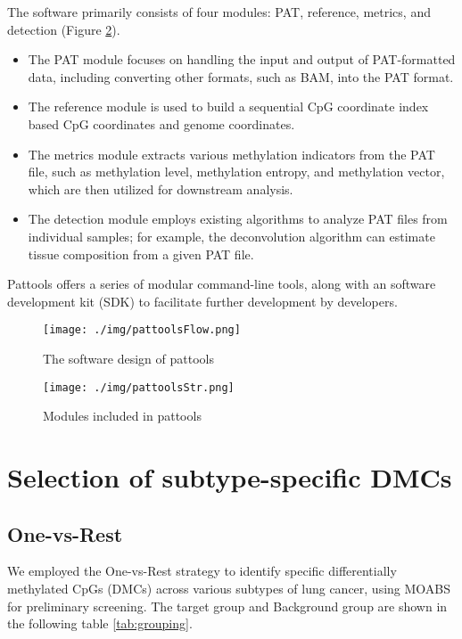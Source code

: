 \documentclass[12pt,letterpaper]{article}
\begin{document}
The software primarily consists of four modules: PAT, reference, metrics, and detection  (Figure \ref*{fig:pattoolsStr}).

\begin{itemize}
    \item  The PAT module focuses on handling the input and output of PAT-formatted data, including converting other formats, such as BAM, into the PAT format. 
    \item  The reference module is used to build a sequential CpG coordinate index based CpG coordinates and genome coordinates. 
    \item  The metrics module extracts various methylation indicators from the PAT file, such as methylation level, methylation entropy, and methylation vector, which are then utilized for downstream analysis.
    \item  The detection module employs existing algorithms to analyze PAT files from individual samples; for example, the deconvolution algorithm can estimate tissue composition from a given PAT file.
\end{itemize}

Pattools offers a series of modular command-line tools, along with an software development kit (SDK) to facilitate further development by developers. 

\begin{figure}[ht]
    \centering
    \texttt{[image: ./img/pattoolsFlow.png]}
    \caption{The software design of pattools}
    \label{fig:pattools}
\end{figure}

\begin{figure}[ht]
    \centering
    \texttt{[image: ./img/pattoolsStr.png]}
    \caption{Modules included in pattools}
    \label{fig:pattoolsStr}
\end{figure}

\section{Selection of subtype-specific DMCs}\label{sec:selection-of-dmcs}

\subsection{One-vs-Rest}

We employed the One-vs-Rest strategy to identify specific differentially methylated CpGs (DMCs) across various
subtypes of lung cancer, using MOABS\cite{sun_moabs_2014} for preliminary screening. The target group and Background
group are shown in the following table \ref*{tab:grouping}.
\end{document}
